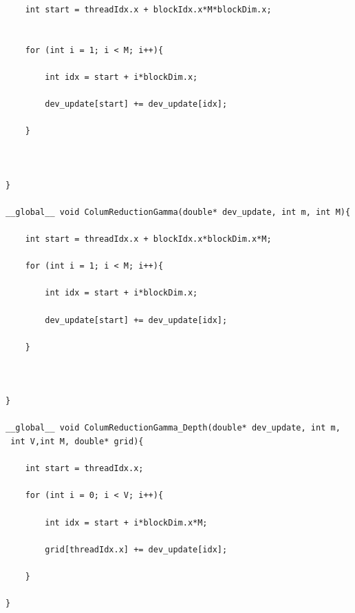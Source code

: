 \documentclass[english, paper=a4]{scrartcl}
\begin{document}
\begin{verbatim}
	int start = threadIdx.x + blockIdx.x*M*blockDim.x;


	for (int i = 1; i < M; i++){

		int idx = start + i*blockDim.x;

		dev_update[start] += dev_update[idx];

	}



}

__global__ void ColumReductionGamma(double* dev_update, int m, int M){

	int start = threadIdx.x + blockIdx.x*blockDim.x*M;

	for (int i = 1; i < M; i++){

		int idx = start + i*blockDim.x;

		dev_update[start] += dev_update[idx];

	}



}

__global__ void ColumReductionGamma_Depth(double* dev_update, int m,
 int V,int M, double* grid){

	int start = threadIdx.x;
	
	for (int i = 0; i < V; i++){

		int idx = start + i*blockDim.x*M;

		grid[threadIdx.x] += dev_update[idx];

	}

}
\end{verbatim}
\end{document}
